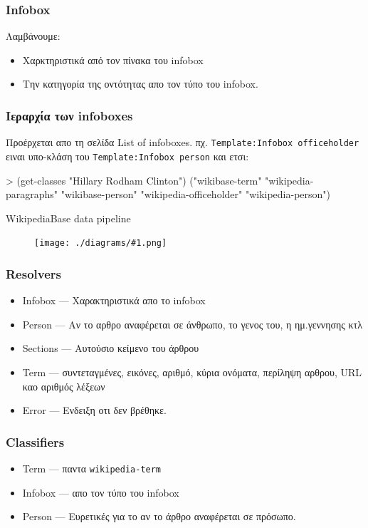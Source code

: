 \documentclass[bigger]{beamer}
\newenvironment{code}{\ttfamily}{\par}
\newcommand{\figframe}[2]{
  \begin{frame}{#2}
    \vfill
    \begin{figure}
      \centering
      \texttt{[image: ./diagrams/\#1.png]}
    \end{figure}
    \vfill
  \end{frame}
}
\begin{document}
\begin{frame}
  \frametitle{Infobox}
  Λαμβάνουμε:
  \begin{itemize}
  \item Χαρκτηριστικά από τον πίνακα του infobox
  \item Την κατηγορία της οντότητας απο τον τύπο του infobox.
  \end{itemize}
\end{frame}

\begin{frame}
  \frametitle{Ιεραρχία των infoboxes}

  Προέρχεται απο τη σελίδα List of infoboxes.
  πχ. \texttt{Template:Infobox officeholder} ειναι υπο-κλάση του
  \texttt{Template:Infobox person} και ετσι:

  \vfill
  \begin{code}
    > (get-classes "Hillary Rodham Clinton")
    ("wikibase-term"
    "wikipedia-paragraphs"
    "wikibase-person"
    "wikipedia-officeholder"
    "wikipedia-person")
  \end{code}
\end{frame}

\figframe{wikipediabase-pipeline}{WikipediaBase data pipeline}

\begin{frame}
  \frametitle{Resolvers}
  \begin{itemize}
  \item Infobox --- Χαρακτηριστικά απο το infobox
  \item Person --- Αν το αρθρο αναφέρεται σε άνθρωπο, το γενος του, η
    ημ.γεννησης κτλ
  \item Sections --- Αυτούσιο κείμενο του άρθρου
  \item Term --- συντεταγμένες, εικόνες, αριθμό, κύρια ονόματα,
    περίληψη αρθρου, URL καο αριθμός λέξεων
  \item Error --- Ενδειξη οτι δεν βρέθηκε.
  \end{itemize}
\end{frame}

\begin{frame}
  \frametitle{Classifiers}
  \begin{itemize}
  \item Term --- παντα \texttt{wikipedia-term}
  \item Infobox --- απο τον τύπο του infobox
  \item Person --- Ευρετικές για το αν το άρθρο αναφέρεται σε πρόσωπο.
  \end{itemize}
\end{frame}
\end{document}
